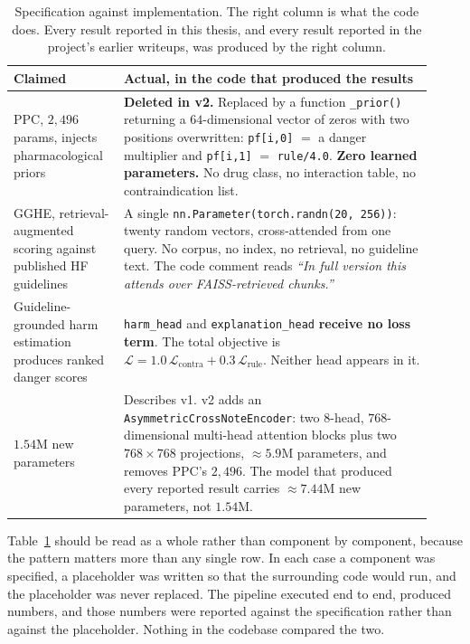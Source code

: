 \begin{table}[t]
\centering
\small
\begin{tabular}{p{0.24\linewidth}p{0.68\linewidth}}
\toprule
\textbf{Claimed} & \textbf{Actual, in the code that produced the results} \\
\midrule
PPC, $2{,}496$ params, injects pharmacological priors
& \textbf{Deleted in v2.} Replaced by a function \texttt{\_prior()} returning a
  $64$-dimensional vector of zeros with two positions overwritten:
  \texttt{pf[i,0]} $=$ a danger multiplier and \texttt{pf[i,1]} $=$
  \texttt{rule/4.0}. \textbf{Zero learned parameters.} No drug class, no
  interaction table, no contraindication list. \\
\addlinespace
GGHE, retrieval-augmented scoring against published HF guidelines
& A single \texttt{nn.Parameter(torch.randn(20, 256))}: twenty random vectors,
  cross-attended from one query. No corpus, no index, no retrieval, no guideline
  text. The code comment reads \emph{``In full version this attends over
  FAISS-retrieved chunks.''} \\
\addlinespace
Guideline-grounded harm estimation produces ranked danger scores
& \texttt{harm\_head} and \texttt{explanation\_head} \textbf{receive no loss
  term}. The total objective is
  $\mathcal{L} = 1.0\,\mathcal{L}_{\text{contra}} + 0.3\,\mathcal{L}_{\text{rule}}$.
  Neither head appears in it. \\
\addlinespace
$1.54$M new parameters
& Describes v1. v2 adds an \texttt{AsymmetricCrossNoteEncoder}: two $8$-head,
  $768$-dimensional multi-head attention blocks plus two $768 \times 768$
  projections, $\approx 5.9$M parameters, and removes PPC's $2{,}496$. The model
  that produced every reported result carries $\approx 7.44$M new parameters, not
  $1.54$M. \\
\bottomrule
\end{tabular}
\caption{Specification against implementation. The right column is what the
code does. Every result reported in this thesis, and every result reported in
the project's earlier writeups, was produced by the right column.}
\label{tab:actual}
\end{table}

Table~\ref{tab:actual} should be read as a whole rather than component by
component, because the pattern matters more than any single row. In each case
a component was specified, a placeholder was written so that the surrounding
code would run, and the placeholder was never replaced. The pipeline executed
end to end, produced numbers, and those numbers were reported against the
specification rather than against the placeholder. Nothing in the codebase
compared the two.

